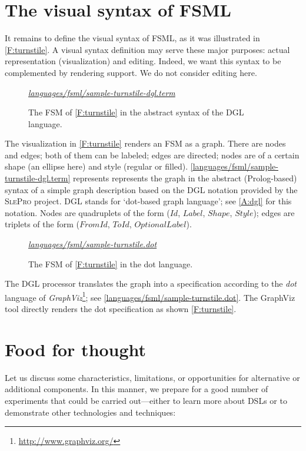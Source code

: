 \documentclass[preprint,authoryear,12pt]{noelsarticle}
\newcommand{\m}[1]{\ensuremath{\mathit{#1}}}
\newcommand{\slepro}{\textsc{SlePro}}
\newcommand{\codefigure}[3]{
\begin{figure}[t!]
\begin{boxedminipage}{\hsize}
\mbox{}\hfill{}{\small\textit{\href{http://github.com/slebok/slepro/tree/master/#2}{#2}}}

\end{boxedminipage}
\caption{#1.}
\label{#2}
\medskip
\end{figure}}
\begin{document}

\section{The visual syntax of FSML}
\label{S:visual}

It remains to define the visual syntax of FSML, as it was illustrated
in \autoref{F:turnstile}. A visual syntax definition may serve these
major purposes: actual representation (visualization) and
editing. Indeed, we want this syntax to be complemented by rendering
support. We do not consider editing here.

\codefigure{%
The FSM of \autoref{F:turnstile} in the abstract syntax of the DGL language}{%
languages/fsml/sample-turnstile-dgl.term}{%
prolog}

The visualization in \autoref{F:turnstile} renders an FSM as a
graph. There are nodes and edges; both of them can be labeled; edges
are directed; nodes are of a certain shape (an ellipse here) and style
(regular or
filled). \autoref{languages/fsml/sample-turnstile-dgl.term} represents
represents the graph in the abstract (Prolog-based) syntax of a simple
graph description based on the DGL notation provided by the \slepro{}
project. DGL stands for `dot-based graph language'; see \ref{A:dgl}
for this notation. Nodes are quadruplets of the form (\m{Id},
\m{Label}, \m{Shape}, \m{Style}); edges are triplets of the form
(\m{FromId}, \m{ToId}, \m{OptionalLabel}).

\codefigure{%
The FSM of \autoref{F:turnstile} in the dot language}{%
languages/fsml/sample-turnstile.dot}{%
dot}

The DGL processor translates the graph into a specification according
to the \emph{dot} language of
\emph{GraphViz}\footnote{\url{http://www.graphviz.org/}}; see
\autoref{languages/fsml/sample-turnstile.dot}. The GraphViz tool
directly renders the dot specification as shown \autoref{F:turnstile}.


\section{Food for thought}
\label{S:concl}

Let us discuss some characteristics, limitations, or opportunities
for alternative or additional components. In this manner, we prepare
for a good number of experiments that could be carried out---either to
learn more about DSLs or to demonstrate other technologies and
techniques:
\end{document}
